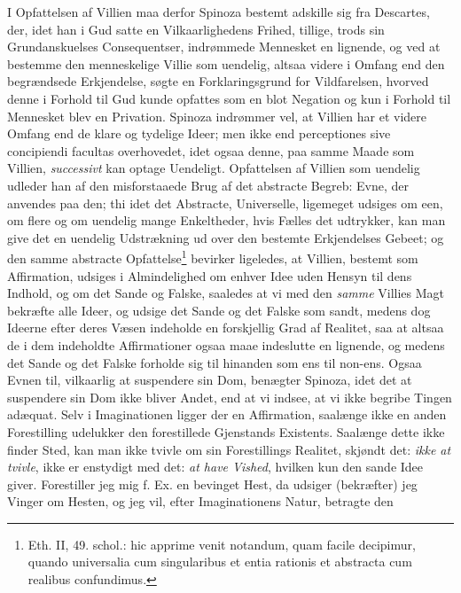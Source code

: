 \documentclass[12pt,a4paper]{book}
\newcommand{\opage}[1]{\marginnote{\footnotesize\textit{[#1]}}}
\begin{document}
I Opfattelsen af Villien maa derfor Spinoza bestemt adskille sig fra
Descartes, der, idet han i Gud satte en Vilkaarlighedens Frihed,
tillige, trods sin Grundanskuelses Consequentser, indrømmede
Mennesket en lignende, og ved at bestemme den menneskelige Villie
som uendelig, altsaa videre i Omfang end den begrændsede
Erkjendelse, søgte en Forklaringsgrund for Vildfarelsen, hvorved
denne i Forhold til Gud kunde opfattes som en blot Negation og kun i
Forhold til Mennesket blev en Privation. Spinoza indrømmer vel, at
Villien har et videre Omfang end de klare og tydelige Ideer; men
ikke end perceptiones sive concipiendi facultas overhovedet, idet
ogsaa denne, paa samme Maade som Villien, \emph{successivt} kan
optage Uendeligt. Opfattelsen af Villien som uendelig udleder han af
den misforstaaede Brug af det abstracte Begreb: Evne, der anvendes
paa den; thi idet det Abstracte, Universelle, ligemeget udsiges om
een, om flere og om uendelig mange Enkeltheder, hvis Fælles det
udtrykker, kan man give det en uendelig Udstrækning ud over den
bestemte Erkjendelses Gebeet; og den samme abstracte
Opfattelse\footnote{Eth. II, 49. schol.: hic apprime venit notandum,
quam facile decipimur, quando universalia cum singularibus et
entia rationis et abstracta cum realibus confundimus.} bevirker
ligeledes, at Villien, bestemt som Affirmation, udsiges i
Almindelighed om enhver Idee uden Hensyn til dens Indhold, og om det
Sande og Falske, saaledes at vi med den \emph{samme} Villies Magt bekræfte
alle Ideer, og udsige det Sande og det Falske som sandt, medens dog
Ideerne efter deres Væsen indeholde en forskjellig Grad af Realitet,
saa at altsaa de i dem indeholdte Affirmationer ogsaa maae indeslutte
en lignende, og medens det Sande og det Falske forholde sig til
hinanden som ens til non-ens. Ogsaa Evnen til, vilkaarlig at
suspendere sin Dom, benægter Spinoza, idet det at suspendere sin Dom
ikke bliver Andet, end at vi
\opage{107} \setcounter{footnote}{0}%
indsee, at vi ikke begribe Tingen adæquat. Selv i Imaginationen
ligger der en Affirmation, saalænge ikke en anden Forestilling
udelukker den forestillede Gjenstands Existents. Saalænge dette
ikke finder Sted, kan man ikke tvivle om sin Forestillings Realitet,
skjøndt det: \emph{ikke at tvivle}, ikke er enstydigt med det:
\emph{at have Vished}, hvilken kun den sande Idee giver. Forestiller
jeg mig f. Ex. en bevinget Hest, da udsiger (bekræfter) jeg Vinger
om Hesten, og jeg vil, efter Imaginationens Natur, betragte den
\end{document}
